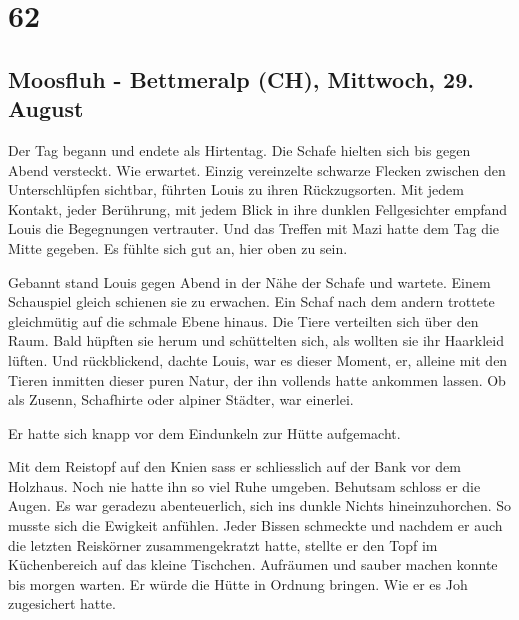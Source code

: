 \chapter{62}

\section{Moosfluh - Bettmeralp (CH), Mittwoch, 29.
August}

Der Tag begann und endete als Hirtentag. Die Schafe hielten sich bis gegen Abend versteckt. Wie erwartet. Einzig vereinzelte schwarze Flecken zwischen den Unterschlüpfen sichtbar, führten Louis zu ihren Rückzugsorten. Mit jedem Kontakt,
jeder Berührung, mit jedem Blick in ihre dunklen Fellgesichter empfand Louis
die Begegnungen vertrauter. Und das Treffen mit Mazi hatte dem Tag die Mitte gegeben. Es fühlte sich gut an, hier oben zu sein. 

Gebannt stand Louis gegen Abend in der Nähe der Schafe und wartete. Einem Schauspiel
gleich schienen sie zu erwachen. Ein Schaf nach dem andern trottete gleichmütig auf die schmale Ebene hinaus. 
Die Tiere verteilten sich über den Raum. Bald hüpften sie herum und schüttelten sich, als wollten sie ihr
Haarkleid lüften. Und rückblickend, dachte Louis, war es dieser Moment, er, alleine mit den Tieren inmitten dieser puren Natur, der ihn vollends
hatte ankommen lassen. Ob als Zusenn, Schafhirte oder alpiner Städter, war einerlei.

\sectionbreak

Er hatte sich knapp vor dem Eindunkeln zur Hütte aufgemacht. 

Mit dem Reistopf auf den Knien sass er schliesslich auf der Bank vor
dem Holzhaus. Noch nie hatte ihn so viel Ruhe umgeben. Behutsam schloss er die Augen. 
Es war geradezu abenteuerlich, sich ins dunkle Nichts hineinzuhorchen. So musste sich die Ewigkeit anfühlen.
Jeder Bissen schmeckte und nachdem er auch die letzten Reiskörner zusammengekratzt hatte, 
stellte er den Topf im Küchenbereich auf das kleine Tischchen. Aufräumen und sauber machen konnte bis morgen warten. Er würde die Hütte in Ordnung bringen. Wie er es Joh zugesichert hatte.

